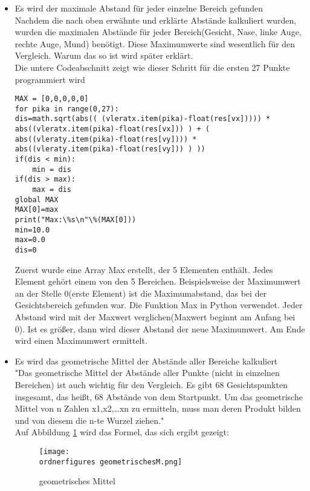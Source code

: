 \begin{enumerate}
\begin{itemize}
	\item Es wird der maximale Abstand für jeder einzelne Bereich gefunden \\
	
	Nachdem die nach oben erwähnte und erklärte Abstände kalkuliert wurden, wurden die maximalen Abstände für jeder Bereich(Gesicht, Nase, linke Auge, rechte Auge, Mund) benötigt. Diese Maximumwerte sind wesentlich für den Vergleich. Warum das so ist wird später erklärt. \\
	Die untere Codeabschnitt zeigt wie dieser Schritt für die ersten 27 Punkte programmiert wird \\
	
\begin{lstlisting}
MAX = [0,0,0,0,0]
for pika in range(0,27):
dis=math.sqrt(abs(( (vleratx.item(pika)-float(res[vx])))) * 
abs((vleratx.item(pika)-float(res[vx])) ) + ( 
abs((vleraty.item(pika)-float(res[vy]))) * 
abs((vleraty.item(pika)-float(res[vy])) ) ))
if(dis < min):
	min = dis
if(dis > max):
	max = dis    
global MAX
MAX[0]=max
print("Max:\%s\n"\%(MAX[0]))
min=10.0
max=0.0
dis=0
\end{lstlisting}
	
	Zuerst wurde eine Array Max erstellt, der 5 Elementen enthält. Jedes Element gehört einem von den 5 Bereichen. Beispielsweise der Maximumwert an der Stelle 0(erste Element) ist die Maximumabstand, das bei der Gesichtsbereich gefunden war. Die Funktion Max in Python verwendet. Jeder Abstand wird mit der Maxwert verglichen(Maxwert beginnt am Anfang bei 0). Ist es größer, dann wird dieser Abstand der neue Maximumwert. Am Ende wird einen Maximumwert ermittelt.
	
	\item Es wird das geometrische Mittel der Abstände aller Bereiche kalkuliert \\
	
	"Das geometrische Mittel der Abstände aller Punkte (nicht in einzelnen Bereichen) ist auch wichtig für den Vergleich. Es gibt 68 Gesichtspunkten insgesamt, das heißt, 68 Abstände von dem Startpunkt. 
	Um das geometrische Mittel von n Zahlen x1,x2,…xn zu ermitteln, muss man deren Produkt bilden und von diesem die n-te Wurzel ziehen."\cite{geometrischesM}\\
	
	Auf Abbildung \ref{fig:geometrischesM} wird das Formel, das sich ergibt gezeigt:
	
	\begin{figure}[H]
		\centering
		\texttt{[image: \\ordnerfigures geometrischesM.png]}
		\caption{geometrisches Mittel}
		\label{fig:geometrischesM}
	\end{figure}


\end{itemize}
\end{enumerate}
